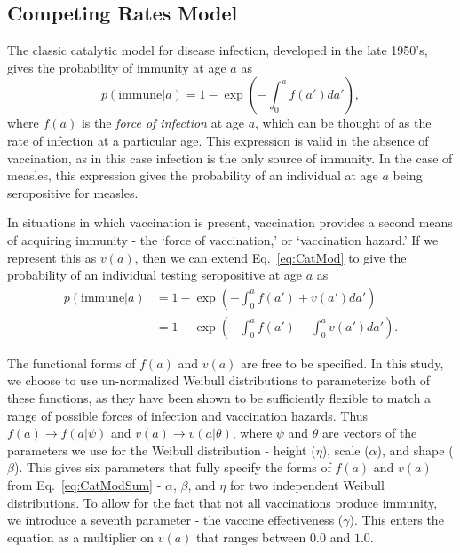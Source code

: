 \documentclass[nofootinbib,aps,pre,twocolumn,superscriptaddress,showkeys,showpacs]{revtex4-1}
\begin{document}
\subsection{Competing Rates Model \label{subsec:CompetingRates}}
The classic catalytic model for disease infection, developed in the late 1950's, gives the probability of immunity at age $a$ as
\begin{equation}
p(\mathrm{immune}|a) = 1 - \exp\left(-\int_0^a f(a') da'\right),
\label{eq:CatMod}
\end{equation}
where $f(a)$ is the \emph{force of infection} at age $a$, which can be thought of as the rate of infection at a particular age. This expression is valid in the absence of vaccination, as in this case infection is the only source of immunity. In the case of measles, this expression gives the probability of an individual at age $a$ being seropositive for measles.

In situations in which vaccination is present, vaccination provides a second means of acquiring immunity - the `force of vaccination,' or `vaccination hazard.' If we represent this as $v(a)$, then we can extend Eq.~\ref{eq:CatMod} to give the probability of an individual testing seropositive at age $a$ as
\begin{align}
p(\mathrm{immune}|a)  &= 1 - \exp\left( - \int_0^a f(a') + v(a') da'\right) \nonumber \\ 
&=1 - \exp\left(-\int_0^a f(a') - \int_0^a v(a') da'\right).
\label{eq:CatModSum}
\end{align}

The functional forms of $f(a)$ and $v(a)$ are free to be specified. In this study, we choose to use un-normalized Weibull distributions to parameterize both of these functions, as they have been shown to be sufficiently flexible to match a range of possible forces of infection and vaccination hazards. Thus $f(a) \rightarrow f(a|\mathbb{\psi})$ and $v(a) \rightarrow v(a|\mathbb{\theta})$, where $\mathbb{\psi}$ and $\mathbb{\theta}$ are vectors of the parameters we use for the Weibull distribution - height ($\eta$), scale ($\alpha$), and shape ($\beta$). This gives six parameters that fully specify the forms of $f(a)$ and $v(a)$ from Eq.~\ref{eq:CatModSum} - $\alpha$, $\beta$, and $\eta$ for two independent Weibull distributions. To allow for the fact that not all vaccinations produce immunity, we introduce a seventh parameter - the vaccine effectiveness ($\gamma$). This enters the equation as a multiplier on $v(a)$ that ranges between $0.0$ and $1.0$.
\end{document}
